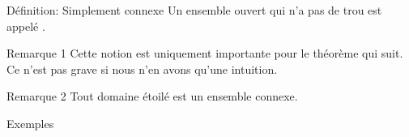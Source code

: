 \documentclass[a4paper]{article}
\begin{document}
\begin{parag}{Définition: Simplement connexe}
    Un ensemble ouvert qui n'a pas de trou est appelé .

    \begin{subparag}{Remarque 1}
        Cette notion est uniquement importante pour le théorème qui suit. Ce n'est pas grave si nous n'en avons qu'une intuition.
    \end{subparag}

    \begin{subparag}{Remarque 2}
        Tout domaine étoilé est un ensemble connexe.
    \end{subparag}

    \begin{subparag}{Exemples}
    \end{subparag}
\end{parag}
\end{document}
